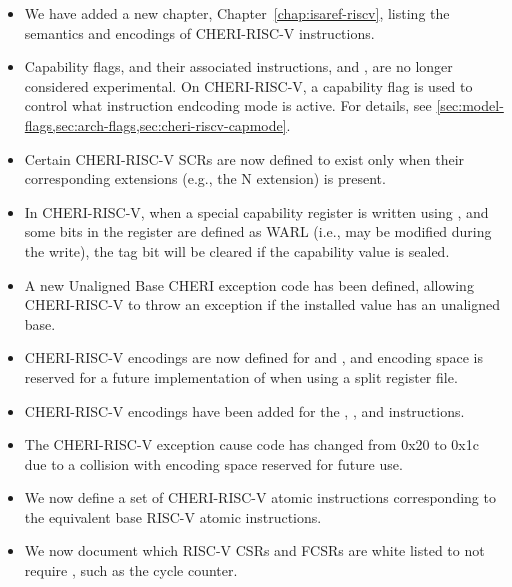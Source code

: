 \begin{itemize}
\item We have added a new chapter, Chapter~\ref{chap:isaref-riscv}, listing the
  semantics and encodings of CHERI-RISC-V instructions.

\item Capability flags, and their associated instructions,
   and , are no longer considered
  experimental.
  On CHERI-RISC-V, a capability flag is used to control what instruction
  endcoding mode is active.
  For details, see
  \cref{sec:model-flags,sec:arch-flags,sec:cheri-riscv-capmode}.

\item Certain CHERI-RISC-V SCRs are now defined to exist only when their
  corresponding extensions (e.g., the N extension) is present.

\item In CHERI-RISC-V, when a special capability register is written using
  , and some bits in the register are defined as WARL
  (i.e., may be modified during the write), the tag bit will be cleared if the
  capability value is sealed.

\item A new Unaligned Base CHERI exception code has been defined, allowing
  CHERI-RISC-V to throw an exception if the installed \PCC{} value has an
  unaligned base.

\item CHERI-RISC-V encodings are now defined for  and
  , and encoding space is reserved for a future implementation of
   when using a split register file.

\item CHERI-RISC-V encodings have been added for the
  , , and
   instructions.

\item The CHERI-RISC-V exception cause code has changed from 0x20 to 0x1c
  due to a collision with encoding space reserved for future use.

\item We now define a set of CHERI-RISC-V atomic instructions corresponding to
  the equivalent base RISC-V atomic instructions.

\item We now document which RISC-V CSRs and FCSRs are white listed to not
  require \cappermASR, such as the cycle counter.


\end{itemize}
